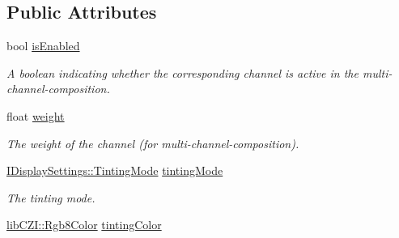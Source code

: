 \subsection*{Public Attributes}
\begin{DoxyCompactItemize}
\item 
\mbox{\label{structlib_c_z_i_1_1_channel_display_settings_p_o_d_a1bc6d34f37c6cbbe445706a18b1c0d0d}} 
bool \hyperlink{structlib_c_z_i_1_1_channel_display_settings_p_o_d_a1bc6d34f37c6cbbe445706a18b1c0d0d}{is\+Enabled}
\begin{DoxyCompactList}\small\item\em A boolean indicating whether the corresponding channel is \textquotesingle{}active\textquotesingle{} in the multi-\/channel-\/composition. \end{DoxyCompactList}\item 
\mbox{\label{structlib_c_z_i_1_1_channel_display_settings_p_o_d_ab887371af43cefafeeab87628f3d281a}} 
float \hyperlink{structlib_c_z_i_1_1_channel_display_settings_p_o_d_ab887371af43cefafeeab87628f3d281a}{weight}
\begin{DoxyCompactList}\small\item\em The weight of the channel (for multi-\/channel-\/composition). \end{DoxyCompactList}\item 
\mbox{\label{structlib_c_z_i_1_1_channel_display_settings_p_o_d_a3829067d6622854bddfb66f3e39718d1}} 
\hyperlink{classlib_c_z_i_1_1_i_display_settings_a5a69bda933a814a09f15983606047876}{I\+Display\+Settings\+::\+Tinting\+Mode} \hyperlink{structlib_c_z_i_1_1_channel_display_settings_p_o_d_a3829067d6622854bddfb66f3e39718d1}{tinting\+Mode}
\begin{DoxyCompactList}\small\item\em The tinting mode. \end{DoxyCompactList}\item 
\mbox{\label{structlib_c_z_i_1_1_channel_display_settings_p_o_d_aaecc9fb8046318f7eba1d711e20b824b}} 
\hyperlink{structlib_c_z_i_1_1_rgb8_color}{lib\+C\+Z\+I\+::\+Rgb8\+Color} \hyperlink{structlib_c_z_i_1_1_channel_display_settings_p_o_d_aaecc9fb8046318f7eba1d711e20b824b}{tinting\+Color}

\end{DoxyCompactItemize}
